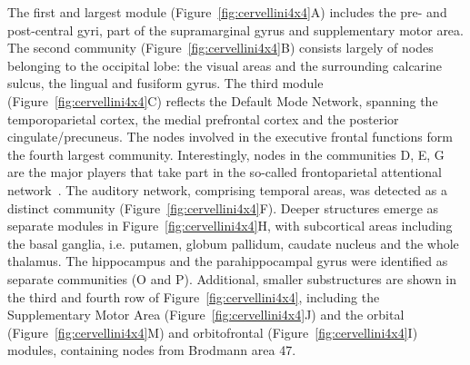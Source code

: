 The first and largest module (Figure~\ref{fig:cervellini4x4}A) includes the pre- and post-central gyri, part of the supramarginal gyrus and supplementary motor area.
The second community (Figure~\ref{fig:cervellini4x4}B) consists largely of nodes belonging to the occipital lobe: the visual areas and the surrounding calcarine sulcus, the lingual and fusiform gyrus.
The third module (Figure~\ref{fig:cervellini4x4}C) reflects the Default Mode Network, spanning the temporoparietal cortex, the medial prefrontal cortex and the posterior cingulate/precuneus.
The nodes involved in the executive frontal functions form the fourth largest community.
Interestingly, nodes in the communities D, E, G are the major players that take part in the so-called frontoparietal attentional network~\cite{markett2014}.
The auditory network, comprising temporal areas, was detected as a distinct community (Figure~\ref{fig:cervellini4x4}F).
Deeper structures emerge as separate modules in Figure~\ref{fig:cervellini4x4}H, with subcortical areas including the basal ganglia, i.e.
putamen, globum pallidum, caudate nucleus and the whole thalamus.
The hippocampus and the parahippocampal gyrus were identified as separate communities (O and P).
Additional, smaller substructures are shown in the third and fourth row of Figure~\ref{fig:cervellini4x4}, including the Supplementary Motor Area (Figure~\ref{fig:cervellini4x4}J) and the orbital (Figure~\ref{fig:cervellini4x4}M) and orbitofrontal (Figure~\ref{fig:cervellini4x4}I) modules, containing nodes from Brodmann area 47.


